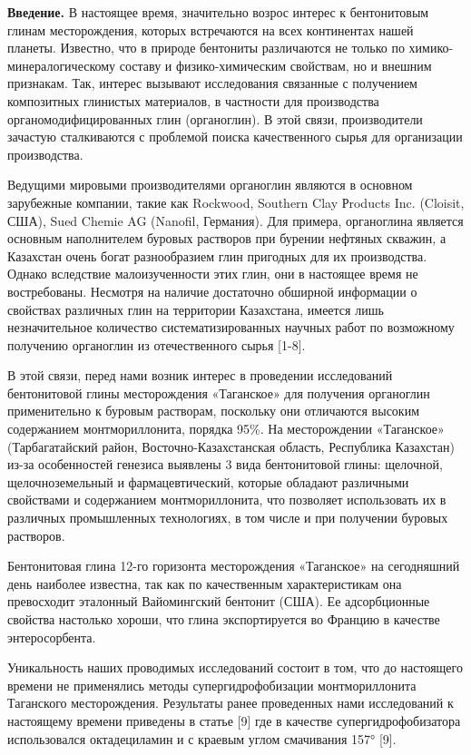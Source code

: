 \begin{multicols}{2}
{\bfseries Введение.} В настоящее время, значительно возрос интерес к
бентонитовым глинам месторождения, которых встречаются на всех
континентах нашей планеты. Известно, что в природе бентониты различаются
не только по химико-минералогическому составу и физико-химическим
свойствам, но и внешним признакам. Так, интерес вызывают исследования
связанные с получением композитных глинистых материалов, в частности для
производства органомодифицированных глин (органоглин). В этой связи,
производители зачастую сталкиваются с проблемой поиска качественного
сырья для организации производства.

Ведущими мировыми производителями органоглин являются в основном
зарубежные компании, такие как Rockwood, Southern Clay Рroducts Inc.
(Cloisit, США), Sued Chemie AG (Nanofil, Германия). Для примера,
органоглина является основным наполнителем буровых растворов при бурении
нефтяных скважин, а Казахстан очень богат разнообразием глин пригодных
для их производства. Однако вследствие малоизученности этих глин, они в
настоящее время не востребованы. Несмотря на наличие достаточно обширной
информации о свойствах различных глин на территории Казахстана, имеется
лишь незначительное количество систематизированных научных работ по
возможному получению органоглин из отечественного сырья {[}1-8{]}.

В этой связи, перед нами возник интерес в проведении исследований
бентонитовой глины месторождения «Таганское» для получения органоглин
применительно к буровым растворам, поскольку они отличаются высоким
содержанием монтмориллонита, порядка 95\%. На месторождении «Таганское»
(Тарбагатайский район, Восточно-Казахстанская область, Республика
Казахстан) из-за особенностей генезиса выявлены 3 вида бентонитовой
глины: щелочной, щелочноземельный и фармацевтический, которые обладают
различными свойствами и содержанием монтмориллонита, что позволяет
использовать их в различных промышленных технологиях, в том числе и при
получении буровых растворов.

Бентонитовая глина 12-го горизонта месторождения «Таганское» на
сегодняшний день наиболее известна, так как по качественным
характеристикам она превосходит эталонный Вайомингский бентонит (США).
Ее адсорбционные свойства настолько хороши, что глина экспортируется во
Францию в качестве энтеросорбента.

Уникальность наших проводимых исследований состоит в том, что до
настоящего времени не применялись методы супергидрофобизации
монтмориллонита Таганского месторождения. Результаты ранее проведенных
нами исследований к настоящему времени приведены в статье {[}9{]} где в
качестве супергидрофобизатора использовался октадециламин и с краевым
углом смачивания 157° {[}9{]}.


\end{multicols}
